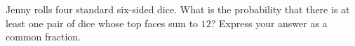 Jenny rolls four standard six-sided dice. What is the probability that there is at least one pair of dice whose top faces sum to $12$? Express your answer as a common fraction.
